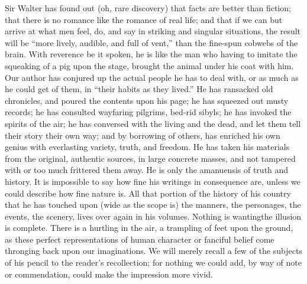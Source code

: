 Sir Walter has found out (oh, rare discovery) that facts are
better than fiction; that there is no romance like the romance of
real life; and that if we can but arrive at what men feel, do, and
say in striking and singular situations, the result will be ``more
lively, audible, and full of vent,'' than the fine-spun cobwebs of
the brain. With reverence be it spoken, he is like the man who
having to imitate the squeaking of a pig upon the stage, brought
the animal under his coat with him. Our author has conjured up the
actual people he has to deal with, or as much as he could get of
them, in ``their habits as they lived.'' He has ransacked old
chronicles, and poured the contents upon his page; he has squeezed
out musty records; he has consulted wayfaring pilgrims, bed-rid
sibyls; he has invoked the spirits of the air; he has conversed
with the living and the dead, and let them tell their story their
own way; and by borrowing of others, has enriched his own genius
with everlasting variety, truth, and freedom. He has taken his
materials from the original, authentic sources, in large concrete
masses, and not tampered with or too much frittered them away. He
is only the amanuensis of truth and history. It is impossible to
say how fine his writings in consequence are, unless we could
describe how fine nature is. All that portion of the history of
his country that he has touched upon (wide as the scope is) the
manners, the personages, the events, the scenery, lives over again
in his volumes. Nothing is wanting\textemdash the illusion is
complete. There is a hurtling in the air, a trampling of feet upon
the ground, as these perfect representations of human character or
fanciful belief come thronging back upon our imaginations. We will
merely recall a few of the subjects of his pencil to the reader's
recollection; for nothing we could add, by way of note or
commendation, could make the impression more vivid.

